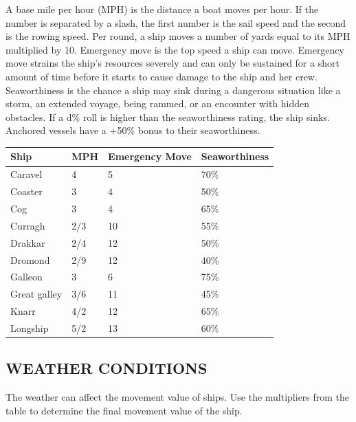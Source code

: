 \begin{multicols}{2}
\begin{minipage}{\columnwidth}
\end{minipage}

A base mile per hour (MPH) is the distance a boat moves per hour.  If the number is separated by a slash, the first number is the sail speed and the second is the rowing speed.  Per round, a ship moves a number of yards equal to its MPH multiplied by 10.  Emergency move is the top speed a ship can move.  Emergency move strains the ship's resources severely and can only be sustained for a short amount of time before it starts to cause damage to the ship and her crew.  Seaworthiness is the chance a ship may sink during a dangerous situation like a storm, an extended voyage, being rammed, or an encounter with hidden obstacles.  If a d\% roll is higher than the seaworthiness rating, the ship sinks.  Anchored vessels have a +50\% bonus to their seaworthiness.

\noindent
\begin{minipage}{\columnwidth}

\label{shipmovement}
\noindent
\begin{tabular}{|p{}|p{}|p{}|p{}|}
\hline
Ship	& MPH	& Emergency Move	& Seaworthiness \\
\hline\hline
\rowcolor[gray]{.9}Caravel		& 4		& 5		& 70\% \\
\rowcolor[gray]{.9}Coaster		& 3		& 4		& 50\% \\
Cog			& 3		& 4		& 65\% \\
\rowcolor[gray]{.9}Curragh		& 2/3	& 10	& 55\% \\
Drakkar		& 2/4	& 12	& 50\% \\
\rowcolor[gray]{.9}Dromond		& 2/9	& 12	& 40\% \\
Galleon		& 3		& 6		& 75\% \\
\rowcolor[gray]{.9}Great galley	& 3/6	& 11	& 45\% \\
Knarr		& 4/2	& 12	& 65\% \\
\rowcolor[gray]{.9}Longship	& 5/2	& 13	& 60\% \\
\hline
\end{tabular}

\end{minipage}

\subsection{WEATHER CONDITIONS}

The weather can affect the movement value of ships.  Use the multipliers from the table to determine the final movement value of the ship. 


\end{multicols}
